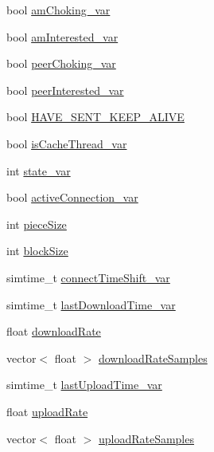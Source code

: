 \begin{DoxyCompactItemize}
\item 
bool \hyperlink{classBTPeerWireClientHandlerBase_a232a0dcff5ea5068ee37ce6feb60d75f}{am\+Choking\+\_\+var}
\item 
bool \hyperlink{classBTPeerWireClientHandlerBase_afd833d1fdbe70b3e22f0d80ebb040942}{am\+Interested\+\_\+var}
\item 
bool \hyperlink{classBTPeerWireClientHandlerBase_af226ba6a190864e05409c566734f31e9}{peer\+Choking\+\_\+var}
\item 
bool \hyperlink{classBTPeerWireClientHandlerBase_ad63929aec8cc95a4db80efff9919516f}{peer\+Interested\+\_\+var}
\item 
bool \hyperlink{classBTPeerWireClientHandlerBase_a6761283c2d4801c427ed94d00fa7ba39}{H\+A\+V\+E\+\_\+\+S\+E\+N\+T\+\_\+\+K\+E\+E\+P\+\_\+\+A\+L\+I\+V\+E}
\item 
bool \hyperlink{classBTPeerWireClientHandlerBase_a0119aa65591b48eab6db03f373c22312}{is\+Cache\+Thread\+\_\+var}
\item 
int \hyperlink{classBTPeerWireClientHandlerBase_a97d1f49189fd7f912b4148b128518f84}{state\+\_\+var}
\item 
bool \hyperlink{classBTPeerWireClientHandlerBase_af4aaf18b3ecce48ba5851f68f2c5c793}{active\+Connection\+\_\+var}
\item 
int \hyperlink{classBTPeerWireClientHandlerBase_aa30272b681919ef32c7c970cb48c7f09}{piece\+Size}
\item 
int \hyperlink{classBTPeerWireClientHandlerBase_a217d740e84250854b887a1d532de3194}{block\+Size}
\item 
simtime\+\_\+t \hyperlink{classBTPeerWireClientHandlerBase_a97d430e045be6c2a9447a154e94a53d0}{connect\+Time\+Shift\+\_\+var}
\item 
simtime\+\_\+t \hyperlink{classBTPeerWireClientHandlerBase_af16f73e12330b3003bf7ebeaab4d5744}{last\+Download\+Time\+\_\+var}
\item 
float \hyperlink{classBTPeerWireClientHandlerBase_a067ff0b7c09c6c772e1d1e7e2acfb1cb}{download\+Rate}
\item 
vector$<$ float $>$ \hyperlink{classBTPeerWireClientHandlerBase_ab64d3371ce1037d35a6e209ad2120523}{download\+Rate\+Samples}
\item 
simtime\+\_\+t \hyperlink{classBTPeerWireClientHandlerBase_abdbac2c435e66c0e23ca4724998cab5e}{last\+Upload\+Time\+\_\+var}
\item 
float \hyperlink{classBTPeerWireClientHandlerBase_afdfbe8c92b63172725568445ddf09ddf}{upload\+Rate}
\item 
vector$<$ float $>$ \hyperlink{classBTPeerWireClientHandlerBase_a14e7dcfe2478465cc7e4d8f715bd5bc2}{upload\+Rate\+Samples}

\end{DoxyCompactItemize}
